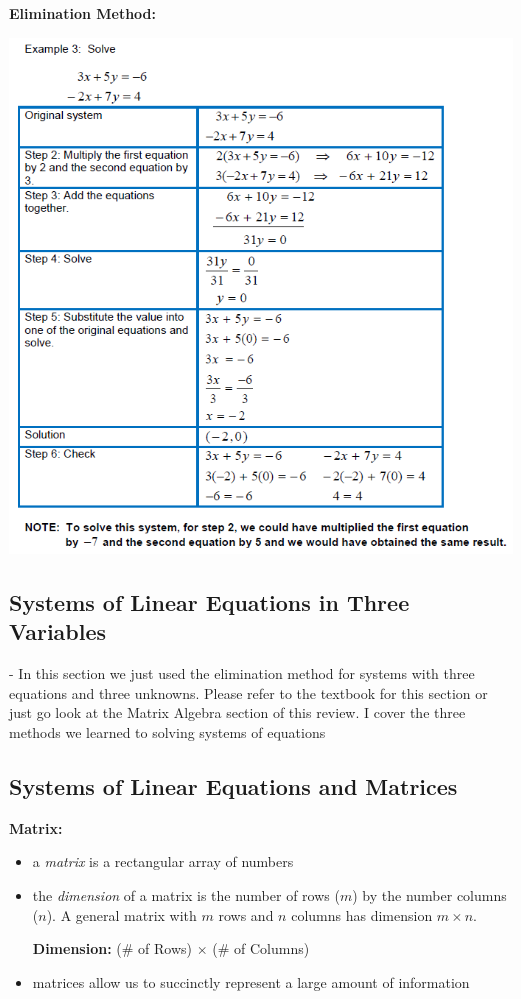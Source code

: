 \documentclass[12pt]{article}
\begin{document}
\newpage

\textbf{Elimination Method:}

\centerline{\includegraphics{Elimination.png}}

\subsection{Systems of Linear Equations in Three Variables}

- In this section we just used the elimination method for systems with three equations and three unknowns. Please refer to the textbook for this section or just go look at the Matrix Algebra section of this review. I cover the three methods we learned to solving systems of equations

\newpage

\subsection{Systems of Linear Equations and Matrices}

\textbf{Matrix:}

\begin{itemize}
\item a \textit{matrix} is a rectangular array of numbers
\item the \textit{dimension} of a matrix is the number of rows ($m$) by the number columns ($n$). A general matrix with $m$ rows and $n$ columns has dimension $m \times n$.

\textbf{Dimension:} (\# of Rows) $\times$ (\# of Columns)
\item matrices allow us to succinctly represent a large amount of information
\end{itemize}
\end{document}
